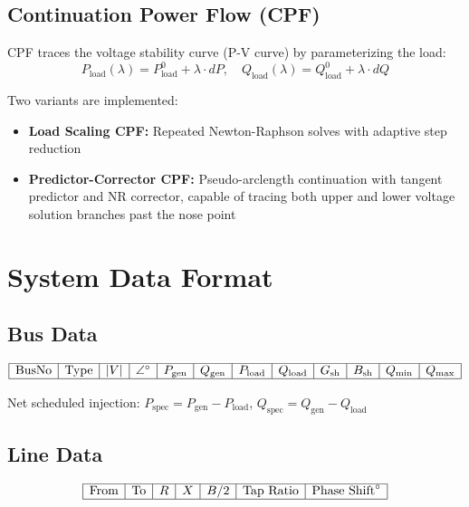 \documentclass[12pt,a4paper]{article}
\begin{document}
\subsection{Continuation Power Flow (CPF)}

CPF traces the voltage stability curve (P-V curve) by parameterizing the load:
\begin{equation}
P_{\text{load}}(\lambda) = P_{\text{load}}^0 + \lambda \cdot dP, \quad Q_{\text{load}}(\lambda) = Q_{\text{load}}^0 + \lambda \cdot dQ
\end{equation}

Two variants are implemented:
\begin{itemize}
    \item \textbf{Load Scaling CPF:} Repeated Newton-Raphson solves with adaptive step reduction
    \item \textbf{Predictor-Corrector CPF:} Pseudo-arclength continuation with tangent predictor and NR corrector, capable of tracing both upper and lower voltage solution branches past the nose point
\end{itemize}

\section{System Data Format}

\subsection{Bus Data}

\begin{equation}
\begin{array}{|c|c|c|c|c|c|c|c|c|c|c|c|}
\hline
\text{BusNo} & \text{Type} & |V| & \angle^{\circ} & P_{\text{gen}} & Q_{\text{gen}} & P_{\text{load}} & Q_{\text{load}} & G_{\text{sh}} & B_{\text{sh}} & Q_{\min} & Q_{\max} \\
\hline
\end{array}
\end{equation}

Net scheduled injection: $P_{\text{spec}} = P_{\text{gen}} - P_{\text{load}}$, $Q_{\text{spec}} = Q_{\text{gen}} - Q_{\text{load}}$

\subsection{Line Data}

\begin{equation}
\begin{array}{|c|c|c|c|c|c|c|}
\hline
\text{From} & \text{To} & R & X & B/2 & \text{Tap Ratio} & \text{Phase Shift}^{\circ} \\
\hline
\end{array}
\end{equation}
\end{document}
